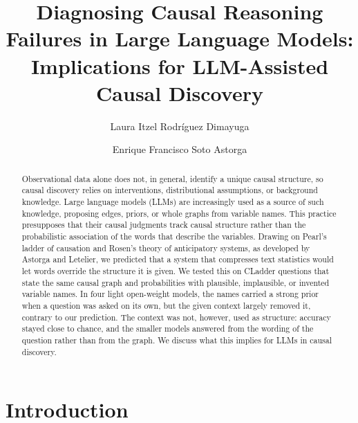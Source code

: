 \documentclass{llncs}
\begin{document}
%
\title{Diagnosing Causal Reasoning Failures in Large Language Models: Implications for LLM-Assisted Causal Discovery}
%
%
\author{Laura Itzel Rodríguez Dimayuga \and Enrique Francisco Soto Astorga}
%
%
%
\maketitle
%
\begin{abstract}
Observational data alone does not, in general, identify a unique causal structure, so causal discovery relies on interventions, distributional assumptions, or background knowledge. Large language models (LLMs) are increasingly used as a source of such knowledge, proposing edges, priors, or whole graphs from variable names. This practice presupposes that their causal judgments track causal structure rather than the probabilistic association of the words that describe the variables. Drawing on Pearl's ladder of causation and Rosen's theory of anticipatory systems, as developed by Astorga and Letelier, we predicted that a system that compresses text statistics would let words override the structure it is given. We tested this on CLadder questions that state the same causal graph and probabilities with plausible, implausible, or invented variable names. In four light open-weight models, the names carried a strong prior when a question was asked on its own, but the given context largely removed it, contrary to our prediction. The context was not, however, used as structure: accuracy stayed close to chance, and the smaller models answered from the wording of the question rather than from the graph. We discuss what this implies for LLMs in causal discovery.

\end{abstract}
%
\section{Introduction}
\label{sec:intro}
\end{document}
